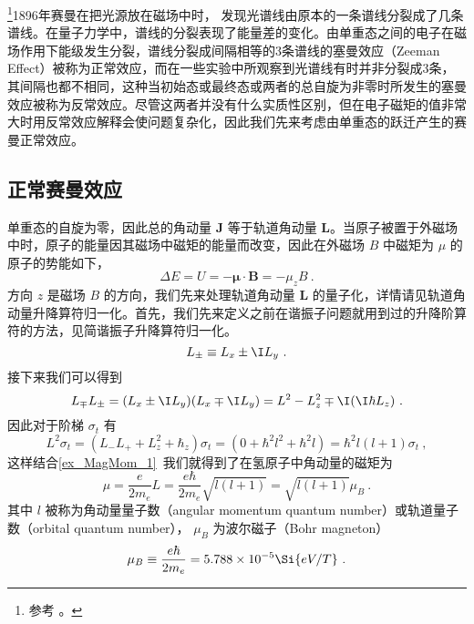 

\footnote{参考 \cite{GriffQ}。}1896年赛曼在把光源放在磁场中时， 发现光谱线由原本的一条谱线分裂成了几条谱线。在量子力学中，谱线的分裂表现了能量差的变化。由单重态之间的电子在磁场作用下能级发生分裂，谱线分裂成间隔相等的3条谱线的塞曼效应（Zeeman Effect）被称为正常效应，而在一些实验中所观察到光谱线有时并非分裂成3条，其间隔也都不相同，这种当初始态或最终态或两者的总自旋为非零时所发生的塞曼效应被称为反常效应。尽管这两者并没有什么实质性区别，但在电子磁矩的值非常大时用反常效应解释会使问题复杂化，因此我们先来考虑由单重态的跃迁产生的赛曼正常效应。

\subsection{正常赛曼效应}
单重态的自旋为零，因此总的角动量 $\mathbf{J}$ 等于轨道角动量 $\mathbf{L}$。当原子被置于外磁场中时，原子的能量因其磁场中磁矩的能量而改变，因此在外磁场 $B$ 中磁矩为 $\mu$ 的原子的势能如下，
\begin{equation}
\Delta E=U = -\boldsymbol\mu\cdot \mathbf{B}=-\mu_z B~.
\end{equation}
方向 $z$ 是磁场 $B$ 的方向，我们先来处理轨道角动量 $\mathbf{L}$ 的量子化，详情请见轨道角动量升降算符归一化。首先，我们先来定义之前在谐振子问题就用到过的升降阶算符的方法，见简谐振子升降算符归一化。
\begin{equation}
L_{\pm}\equiv L_x \pm \I L_y~.
\end{equation}
接下来我们可以得到
\begin{equation}
L_{\mp}L_{\pm}=(L_x \pm \I L_y)(L_x \mp \I L_y)=L^2-L_z^2\mp \I(\I\hbar L_z)~.
\end{equation}
因此对于阶梯 $\sigma_t$ 有
\begin{equation}
L^2\sigma_t=(L_{-}L_{+}+L^2_z+\hbar_z)\sigma_t=(0+\hbar^2l^2+\hbar^2l)=\hbar^2l(l+1)\sigma_t~,
\end{equation}
这样结合\autoref{ex_MagMom_1}~我们就得到了在氢原子中角动量的磁矩为
$$\mu=\frac{e}{2m_e}L=\frac{e\hbar}{2m_e}\sqrt{l(l+1)}=\sqrt{l(l+1)}\mu_B~.$$
其中 $l$ 被称为角动量量子数（angular momentum quantum number）或轨道量子数（orbital quantum number）， $\mu_B$ 为波尔磁子（Bohr magneton）
\begin{equation}
\mu_B\equiv\frac{e\hbar}{2m_e}=5.788\times 10^{-5}\Si{eV/T}~.
\end{equation}
